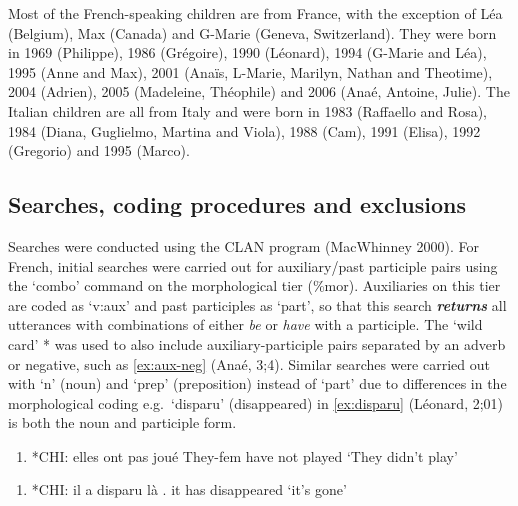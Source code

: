 \documentclass[
  12pt,
]{article}
\begin{document}
\renewcommand*{\arraystretch}{1}

Most of the French-speaking children are from France, with the exception of Léa (Belgium), Max (Canada) and G-Marie (Geneva, Switzerland). They were born in 1969 (Philippe), 1986 (Grégoire), 1990 (Léonard), 1994 (G-Marie and Léa), 1995 (Anne and Max), 2001 (Anaïs, L-Marie, Marilyn, Nathan and Theotime), 2004 (Adrien), 2005 (Madeleine, Théophile) and 2006 (Anaé, Antoine, Julie). The Italian children are all from Italy and were born in 1983 (Raffaello and Rosa), 1984 (Diana, Guglielmo, Martina and Viola), 1988 (Cam), 1991 (Elisa), 1992 (Gregorio) and 1995 (Marco).

\hypertarget{searches}{%
\subsection{Searches, coding procedures and exclusions}\label{searches}}

Searches were conducted using the CLAN program (MacWhinney 2000). For French, initial searches were carried out for auxiliary/past participle pairs using the `combo' command on the morphological tier (\%mor). Auxiliaries on this tier are coded as `v:aux' and past participles as `part', so that this search \textbf{\emph{returns}} all utterances with combinations of either \emph{be} or \emph{have} with a participle. The `wild card' * was used to also include auxiliary-participle pairs separated by an adverb or negative, such as \ref{ex:aux-neg} (Anaé, 3;4). Similar searches were carried out with `n' (noun) and `prep' (preposition) instead of `part' due to differences in the morphological coding e.g.~`disparu' (disappeared) in \ref{ex:disparu} (Léonard, 2;01) is both the noun and participle form.

\begin{enumerate}[resume*]
  \item{*CHI: elles ont pas joué \label{ex:aux-neg}} \newline
              They-fem have not played \newline
              `They didn't play'
  \end{enumerate}

\begin{enumerate}[resume*]
  \item{*CHI:   il a disparu là .  \label{ex:disparu}} \newline
              it has disappeared \newline
              `it's gone'
  \end{enumerate}
\end{document}
